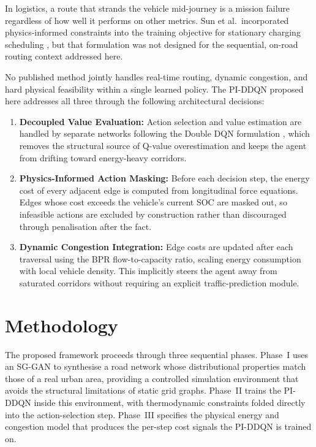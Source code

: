 \documentclass[conference]{IEEEtran}
\begin{document}
In logistics, a route that strands the vehicle mid-journey is a mission failure regardless of how well it performs on other metrics. Sun et al.\ incorporated physics-informed constraints into the training objective for stationary charging scheduling \cite{b13}, but that formulation was not designed for the sequential, on-road routing context addressed here.

No published method jointly handles real-time routing, dynamic congestion, and hard physical feasibility within a single learned policy. The PI-DDQN proposed here addresses all three through the following architectural decisions:

\begin{enumerate}
    \item \textbf{Decoupled Value Evaluation:} Action selection and value estimation are handled by separate networks following the Double DQN formulation \cite{van2016deep}, which removes the structural source of Q-value overestimation and keeps the agent from drifting toward energy-heavy corridors.
    \item \textbf{Physics-Informed Action Masking:} Before each decision step, the energy cost of every adjacent edge is computed from longitudinal force equations. Edges whose cost exceeds the vehicle's current SOC are masked out, so infeasible actions are excluded by construction rather than discouraged through penalisation after the fact.
    \item \textbf{Dynamic Congestion Integration:} Edge costs are updated after each traversal using the BPR flow-to-capacity ratio, scaling energy consumption with local vehicle density. This implicitly steers the agent away from saturated corridors without requiring an explicit traffic-prediction module.
\end{enumerate}

\section{Methodology} \label{III}
The proposed framework proceeds through three sequential phases. Phase~I uses an SG-GAN to synthesise a road network whose distributional properties match those of a real urban area, providing a controlled simulation environment that avoids the structural limitations of static grid graphs. Phase~II trains the PI-DDQN inside this environment, with thermodynamic constraints folded directly into the action-selection step. Phase~III specifies the physical energy and congestion model that produces the per-step cost signals the PI-DDQN is trained on.
\end{document}
